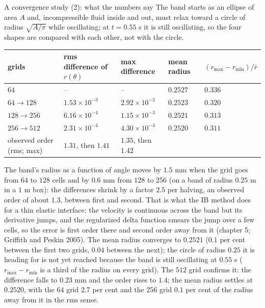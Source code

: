 \documentclass[aspectratio=169,11pt]{beamer}
\begin{document}
\begin{frame}{A convergence study (2): what the numbers say}
\label{fr:conv2}
\scriptsize The band starts as an ellipse of area $A$ and, incompressible fluid inside and out, must relax toward a circle of radius $\sqrt{A/\pi}$ while oscillating; at $t = 0.55$ s it is still oscillating, so the four shapes are compared with each other, not with the circle.
\vspace{1mm}

\scriptsize
\begin{center}
\begin{tabular}{@{}lllll@{}}
\toprule
grids & rms difference of $r(\theta)$ & max difference & mean radius & $(r_{\max} - r_{\min})/\bar r$\\
\midrule
$64$ & -- & -- & $0.2527$ & $0.336$\\
$64 \to 128$ & $1.53\times10^{-3}$ & $2.92\times10^{-3}$ & $0.2523$ & $0.320$\\
$128 \to 256$ & $6.16\times10^{-4}$ & $1.15\times10^{-3}$ & $0.2521$ & $0.313$\\
$256 \to 512$ & $2.31\times10^{-4}$ & $4.30\times10^{-4}$ & $0.2520$ & $0.311$\\
\midrule
observed order (rms; max) & $1.31$, then $1.41$ & $1.35$, then $1.42$ & & \\
\bottomrule
\end{tabular}
\end{center}
\scriptsize The band's radius as a function of angle moves by $1.5$ mm when the grid goes from $64$ to $128$ cells and by $0.6$ mm from $128$ to $256$ (on a band of radius $0.25$ m in a $1$ m box): the differences shrink by a factor $2.5$ per halving, an observed order of about $1.3$, between first and second. That is what the IB method does for a thin elastic interface: the velocity is continuous across the band but its derivative jumps, and the regularized delta function smears the jump over a few cells, so the error is first order there and second order away from it (chapter 5; Griffith and Peskin 2005). The mean radius converges to $0.2521$ ($0.1$ per cent between the first two grids, $0.04$ between the next); the circle of radius $0.25$ it is heading for is not yet reached because the band is still oscillating at $0.55$ s ($r_{\max} - r_{\min}$ is a third of the radius on every grid). The $512$ grid confirms it: the difference falls to $0.23$ mm and the order rises to $1.4$; the mean radius settles at $0.2520$, with the $64$ grid $2.7$ per cent and the $256$ grid $0.1$ per cent of the radius away from it in the rms sense.
\vspace{1mm}


\end{frame}
\end{document}
